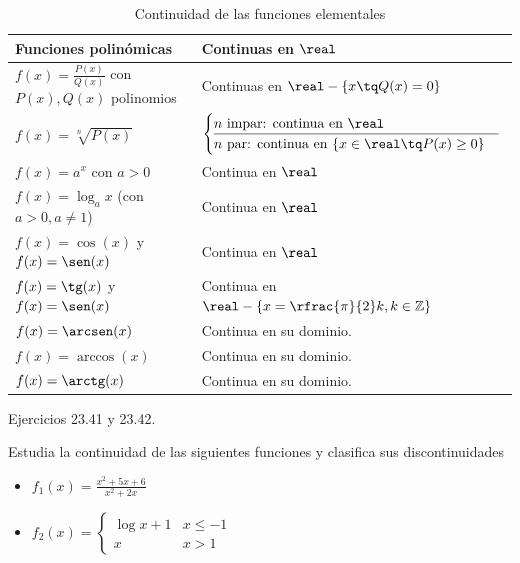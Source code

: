\begin{table}[hbtp]
\begin{tabular}{|l|l|}
\hline
Funciones polinómicas & Continuas en $\real$\\\hline\hline
$f(x) = \frac{P(x)}{Q(x)}$ con $P(x),Q(x)$ polinomios& Continuas en $\real-\{x \tq Q(x)=0\}$\\\hline
$f(x) = \sqrt[n]{P(x)}$ & $\begin{cases}
n\text{ impar: continua en } \real\\\hline
n\text{ par: continua en } \{x\in\real\tq P(x) \geq 0\}\end{cases}$\\\hline
$f(x) = a^x$ con $a>0$ & Continua en $\real$\\\hline
$f(x) = \log_ax$ (con $a>0, a\neq 1$) & Continua en $\real$\\\hline
$f(x) = \cos(x)$ y $f(x) = \sen(x)$  & Continua en $\real$\\\hline
$f(x) = \tg(x)$ y $f(x) = \sen(x)$  & Continua en $\real-\left\{x=\rfrac{\pi}{2}k, k\in\mathbb{Z}\right\}$\\\hline
$f(x) = \arcsen(x)$ & Continua en su dominio.\\
$f(x) = \arccos(x)$ & Continua en su dominio.\\
$f(x) = \arctg(x)$ & Continua en su dominio.\\\hline
\end{tabular}
\label{tbl::ContinuidadFunElementales}
\caption{Continuidad de las funciones elementales}
\end{table}

\begin{problem}
Ejercicios 23.41 y 23.42.
\solution
\end{problem}

\begin{problem}Estudia la continuidad de las siguientes funciones y clasifica sus discontinuidades

\begin{itemize}
	\item $f_1(x) = \displaystyle\frac{x^2+5x+6}{x^2+2x}$
	\item $f_2(x) = \begin{cases}\log{x+1} & x\leq -1\\x & x>1\end{cases}$
\end{itemize}
\solution
\end{problem}



